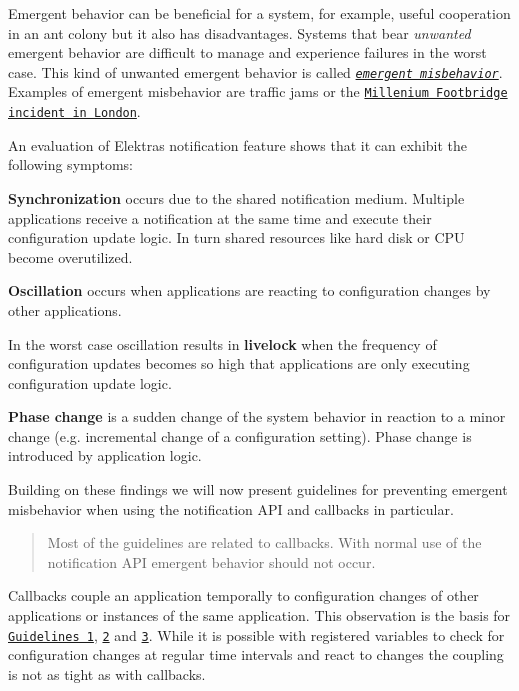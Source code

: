 Emergent behavior can be beneficial for a system, for example, useful cooperation in an ant colony but it also has disadvantages. Systems that bear {\itshape unwanted} emergent behavior are difficult to manage and experience failures in the worst case. This kind of unwanted emergent behavior is called \href{https://dl.acm.org/doi/10.1145/1217935.1217964}{\tt {\itshape emergent misbehavior}}. Examples of emergent misbehavior are traffic jams or the \href{https://researchcourse.pbworks.com/f/structural+engineering.pdf}{\tt Millenium Footbridge} \href{https://www.sciencedaily.com/releases/2005/11/051103080801.htm}{\tt incident in London}.

An evaluation of Elektra\textquotesingle{}s notification feature shows that it can exhibit the following symptoms\+:


\begin{DoxyItemize}
\item {\bfseries Synchronization} occurs due to the shared notification medium. Multiple applications receive a notification at the same time and execute their configuration update logic. In turn shared resources like hard disk or C\+PU become overutilized.
\item {\bfseries Oscillation} occurs when applications are reacting to configuration changes by other applications.
\item In the worst case oscillation results in {\bfseries livelock} when the frequency of configuration updates becomes so high that applications are only executing configuration update logic.
\item {\bfseries Phase change} is a sudden change of the system behavior in reaction to a minor change (e.\+g. incremental change of a configuration setting). Phase change is introduced by application logic.
\end{DoxyItemize}

Building on these findings we will now present guidelines for preventing emergent misbehavior when using the notification A\+PI and callbacks in particular.

\begin{quote}
Most of the guidelines are related to callbacks. With normal use of the notification A\+PI emergent behavior should not occur. \end{quote}


Callbacks couple an application temporally to configuration changes of other applications or instances of the same application. This observation is the basis for \href{#guideline-1-avoid-callbacks}{\tt Guidelines 1}, \href{#guideline-2-wait-before-reacting-to-changes}{\tt 2} and \href{#guideline-3-avoid-updates-as-reaction-to-change}{\tt 3}. While it is possible with registered variables to check for configuration changes at regular time intervals and react to changes the coupling is not as tight as with callbacks.

